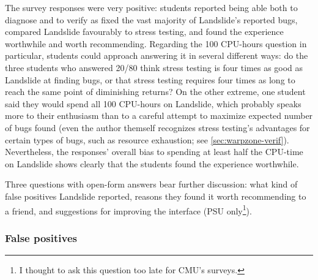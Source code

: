 The survey responses were very positive:
students reported being able both to diagnose and to verify as fixed the vast majority of Landslide's reported bugs,
compared Landslide favourably to stress testing,
and found the experience worthwhile and worth recommending.
Regarding the 100 CPU-hours question in particular,
students could approach answering it in several different ways:
do the three students who answered 20/80 think stress testing is four times as good as Landslide at finding bugs,
or that stress testing requires four times as long to reach the same point of diminishing returns?
On the other extreme, one student said they would spend all 100 CPU-hours on Landslide,
which probably speaks more to their enthusiasm than to a careful attempt to maximize expected number of bugs found
(even the author themself recognizes stress testing's advantages for certain types of bugs,
such as resource exhaustion; see \cref{sec:warpzone-verif}).
Nevertheless, the responses' overall bias to spending at least half the CPU-time on Landslide
shows clearly that the students found the experience worthwhile.

Three questions with open-form answers bear further discussion:
what kind of false positives Landslide reported, %
reasons they found it worth recommending to a friend,
and suggestions for improving the interface
(PSU only\footnote{I thought to ask this question too late for CMU's surveys.}). %

\subsubsection{False positives}
\label{sec:education-eval-survey-falsepositives}

